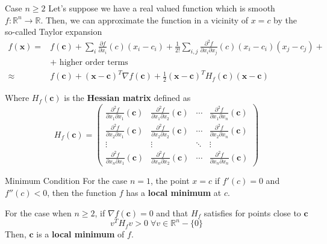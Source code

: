 \documentclass{beamer}
\begin{document}
	\begin{frame}{Case $n\ge 2$}
	Let's suppose we have a real valued function which is smooth $f\colon \mathbb{R}^n\to \mathbb{R}$. Then, we can approximate the function in a vicinity of $x=c$ by the so-called Taylor expansion
	\begin{equation*}
		\begin{split}
	f(\textbf{x}) = &f(\textbf{c})+ \sum_i \frac{\partial f}{\partial x_i}(c) (x_i-c_i)+  \frac{1}{2!} \sum_{i,j}\frac{\partial^2f}{\partial x_i \partial x_j}(c) (x_i-c_i)(x_j-c_j) +\\
	&  +  \text{ higher order terms}\\
	\approx &f(\textbf{c})+ (\textbf{x}-\textbf{c})^T \nabla f(\textbf{c})+ \frac{1}{2} (\textbf{x}-\textbf{c})^T H_f(\textbf{c}) (\textbf{x}-\textbf{c})
		\end{split}
	\end{equation*}

	Where $H_f(\textbf{c})$ is the \textbf{Hessian matrix} defined as 
	\begin{equation*}
		H_f(\textbf{c})= \begin{pmatrix}
			\frac{\partial^2 f}{\partial x_1 \partial x_1} (\textbf{c}) & 	\frac{\partial^2 f}{\partial x_1 \partial x_2} (\textbf{c}) & \cdots & 	\frac{\partial^2 f}{\partial x_1 \partial x_n} (\textbf{c}) \\
				\frac{\partial^2 f}{\partial x_2 \partial x_1} (\textbf{c})  & 	\frac{\partial^2 f}{\partial x_2 \partial x_2} (\textbf{c}) & \cdots & 	\frac{\partial^2 f}{\partial x_2\partial x_n} (\textbf{c})\\
				\vdots & \vdots & \ddots & \vdots\\
					\frac{\partial^2 f}{\partial x_n \partial x_1} (\textbf{c}) & 	\frac{\partial^2 f}{\partial x_n  \partial x_2} (\textbf{c}) & \cdots &	\frac{\partial^2 f}{\partial x_n \partial x_n} (\textbf{c})      
		\end{pmatrix}
	\end{equation*}
\end{frame}

\begin{frame}{Minimum Condition}
	For the case $n=1$, the point $x=c$ if $f'(c)=0$ and $f''(c)<0$, then the function $f$ has a \textbf{local minimum} at $c$. 
	
	For the case when $n\ge 2$, if $\nabla f(\textbf{c})=0$ and that $H_f$ satisfies for points close to $\textbf{c}$
	\begin{equation*}
		v^T H_f  v >0 \; \forall v \in \mathbb{R}^n -\{0\}
	\end{equation*}
	Then, $\textbf{c}$ is a \textbf{local minimum} of $f$.
\end{frame}
	
\end{document}

